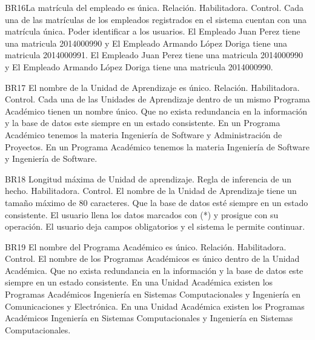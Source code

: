 \begin{BussinesRule}{BR16}{La matrícula del empleado es única.}
    \BRitem[Tipo: ]Relación.
    \BRitem[Clase: ]Habilitadora.
    \BRitem[Nivel: ]Control.
    \BRitem[Descripción:] Cada una de las matrículas de los empleados registrados en el sistema cuentan con una matrícula única.
    \BRitem[Motivación: ]Poder identificar a los usuarios.
     El Empleado Juan Perez tiene una matricula 2014000990  y El Empleado Armando López Doriga  tiene una matricula 2014000991.
    El Empleado Juan Perez tiene una matricula 2014000990 y El Empleado Armando López Doriga  tiene una matricula 2014000990.
\end{BussinesRule}
\begin{BussinesRule}{BR17} {El nombre de la Unidad de Aprendizaje es único.}
    \BRitem[Tipo: ]Relación.
    \BRitem[Clase: ]Habilitadora.
    \BRitem[Nivel: ]Control.
    \BRitem[Descripción: ]Cada  una de las Unidades de Aprendizaje dentro de un mismo Programa Académico tienen un nombre único.
    \BRitem[Motivación: ] Que no exista redundancia en la información y la base de datos este siempre en un estado consistente.
     En un Programa Académico  tenemos la materia Ingeniería de Software y Administración de Proyectos.
    En un Programa Académico  tenemos la materia Ingeniería de Software y  Ingeniería de Software.
\end{BussinesRule}
\begin{BussinesRule}{BR18}{ Longitud máxima de Unidad de aprendizaje.}
    \BRitem[Tipo: ]Regla de inferencia de un hecho.
    \BRitem[Clase: ]Habilitadora.
    \BRitem[Nivel: ]Control.
    \BRitem[Descripción: ]El nombre de la Unidad de Aprendizaje tiene un tamaño máximo de 80 caracteres.
    \BRitem[Sentencia:]
    \BRitem[Motivación: ]Que la base de datos esté siempre en un estado consistente.
     El usuario llena los datos marcados con (*) y prosigue con su operación.
    El usuario deja campos obligatorios y el sistema le permite continuar.
\end{BussinesRule}
\begin{BussinesRule}{BR19} {El nombre del Programa Académico es único.}
    \BRitem[Tipo: ]Relación.
    \BRitem[Clase: ]Habilitadora.
    \BRitem[Nivel: ]Control.
    \BRitem[Descripción: ]El nombre de los Programas Académicos es único dentro de la Unidad Académica.
    \BRitem[Motivación: ] Que no exista redundancia en la información y la base de datos este siempre en un estado consistente.
     En una Unidad Académica existen los Programas Académicos Ingeniería en Sistemas Computacionales y Ingeniería en Comunicaciones y Electrónica.
    En una Unidad Académica existen los Programas Académicos Ingeniería en Sistemas Computacionales y Ingeniería en Sistemas Computacionales.
\end{BussinesRule}
